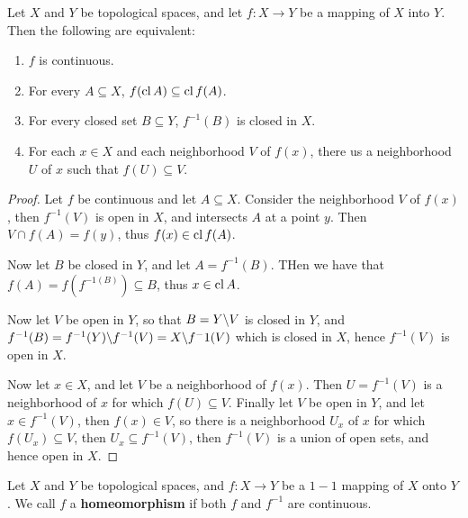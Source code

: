 \begin{theorem}\label{1.7.1}
    Let $X$ and  $Y$ be topological spaces, and let  $f:X \rightarrow Y$ be a mapping of  $X$ into
    $Y$. Then the following are equivalent:
        \begin{enumerate}[label=(\arabic*)]
            \item $f$ is continuous.

            \item For every $A \subseteq X$,  $f(\operatorname{cl}{A}) \subseteq \operatorname{cl}{f(A)}$.

            \item For every closed set $B \subseteq Y$,  $f^{-1}(B)$ is closed in $X$.

            \item For each  $x \in X$ and each neighborhood  $V$ of  $f(x)$, there us a neighborhood
                $U$ of  $x$ such that  $f(U) \subseteq V$.
        \end{enumerate}
\end{theorem}
\begin{proof}
    Let $f$ be continuous and let  $A \subseteq X$. Consider the neighborhood  $V$ of  $f(x)$, then
    $f^{-1}(V)$ is open in $X$, and intersects  $A$ at a point  $y$. Then  $V \cap f(A)=f(y)$, thus 
    $f(x) \in \operatorname{cl}{f(A)}$.

    Now let $B$ be closed in  $Y$, and let  $A=f^{-1}(B)$. THen we have that $f(A)=f(f^{-1(B)})
    \subseteq B$, thus $x \in \operatorname{cl}{A}$.

    Now let $V$ be open in $Y$, so that  $B=Y \backslash V$ is closed in $Y$, and
    $f^{-1}(B)=f^{-1}(Y) \backslash f^{-1}(V)=X \backslash f^-1(V)$ which is closed in $X$, hence
    $f^{-1}(V)$ is open in $X$.

    Now let  $x \in X$, and let  $V$ be a neighborhood of  $f(x)$. Then $U=f^{-1}(V)$ is a
    neighborhood of $x$ for which  $f(U) \subseteq V$. Finally let $V$ be open in  $Y$, and let $x
    \in f^{-1}(V)$, then $f(x) \in V$, so  there is a neighborhood $U_x$ of  $x$ for which  $f(U_x) \subseteq V$,
    then $U_x \subseteq f^{-1}(V)$, then $f^{-1}(V)$ is a union of open sets, and hence open in $X$.
\end{proof}

\begin{definition}
    Let $X$ and  $Y$ be topological spaces, and  $f:X \rightarrow Y$ be a $1-1$ mapping of  $X$ onto
    $Y$. We call  $f$ a \textbf{homeomorphism} if both $f$ and  $f^{-1}$ are continuous.		
\end{definition}

